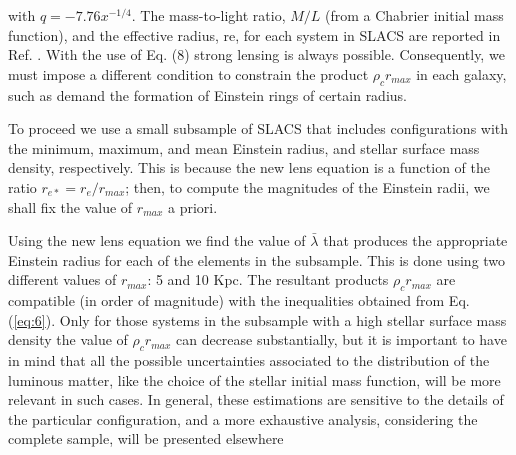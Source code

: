 \documentclass[10pt,twoside,twocolumn]{article}
\begin{document}
with $q=-7.76x^{-1/4}$. The mass-to-light ratio, $M/L$
(from a Chabrier initial mass function), and the effective radius, re, for each system in SLACS are reported
in Ref. \cite{21} . With the use of Eq. (8) strong lensing is always possible. Consequently, we must impose a different
condition to constrain the product $\rho_cr_{max}$ in each galaxy,
such as demand the formation of Einstein rings of certain
radius. \par
To proceed we use a small subsample of SLACS that includes configurations with the minimum, maximum, and
mean Einstein radius, and stellar surface mass density,
respectively. This is because the new lens equation is a
function of the ratio $r_{e*}=r_e/r_{max}$; then, to compute the
magnitudes of the Einstein radii, we shall fix the value of
$r_{max}$ a priori. \par
Using the new lens equation we find the value of $\bar{\lambda}$ that
produces the appropriate Einstein radius for each of the
elements in the subsample. This is done using two different values of $r_{max}$: 5 and 10 Kpc. The resultant products
$\rho_cr_{max}$ are compatible (in order of magnitude) with the
inequalities obtained from Eq. (\ref{eq:6}). Only for those systems in the subsample with a high stellar surface mass
density the value of $\rho_cr_{max}$ can decrease substantially,
but it is important to have in mind that all the possible
uncertainties associated to the distribution of the luminous matter, like the choice of the stellar initial mass
function, will be more relevant in such cases. In general, these estimations are sensitive to the details of the
particular configuration, and a more exhaustive analysis, considering the complete sample, will be presented
elsewhere
\end{document}
